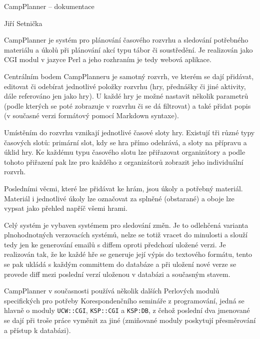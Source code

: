 




\def\heading#1{\goodbreak\bigskip\noindent{\csc\settextsize{15}#1}\medskip}

\centerline{\csc{} CampPlanner -- dokumentace}
\bigskip
\centerline{\csc{} Jiří Setnička}
\bigskip

CampPlanner je systém pro plánování časového rozvrhu a sledování potřebného
materiálu a úkolů při plánování akcí typu tábor či soustředění. Je realizován
jako CGI modul v jazyce Perl a jeho rozhraním je tedy webová aplikace.

Centrálním bodem CampPlanneru je samotný rozvrh, ve kterém se dají přidávat,
editovat či odebírat jednotlivé položky rozvrhu (hry, přednášky či jiné aktivity,
dále referováno jen jako {\I hry}). U každé hry je možné nastavit několik
parametrů (podle kterých se poté zobrazuje v rozvrhu či se dá filtrovat) a také
přidat popis (v současné verzi formátový pomocí Markdown syntaxe).

Umístěním do rozvrhu vznikají jednotlivé časové sloty hry. Existují tři různé
typy časových slotů: primární slot, kdy se hra přímo odehrává, a sloty na
přípravu a úklid hry. Ke každému typu časového slotu lze přiřazovat organizátory
a podle tohoto přiřazení pak lze pro každého z organizátorů zobrazit jeho
individuální rozvrh.

Posledními věcmi, které lze přidávat ke hrám, jsou úkoly a potřebný materiál.
Materiál i jednotlivé úkoly lze označovat za splněné (obstarané) a oboje lze
vypsat jako přehled napříč všemi hrami.

Celý systém je vybaven systémem pro sledování změn. Je to odlehčená varianta
plnohodnotných verzovacích systémů, nelze se totiž vracet do minulosti a slouží
tedy jen ke generování emailů s diffem oproti předchozí uložené verzi. Je
realizován tak, že ke každé hře se generuje její výpis do textového formátu,
tento se pak ukládá s každým committem do databáze a při uložení nové verze se
provede diff mezi poslední verzí uloženou v databázi a současným stavem.

\heading{Použití}

CampPlanner v současnosti používá několik dalších Perlových modulů specifických
pro potřeby Korespondenčního semináře z programování, jedná se hlavně o moduly
{\tt UCW::CGI}, {\tt KSP::CGI} a {\tt KSP:DB}, z čehož poslední dva jmenované se
dají při troše práce vyměnit za jiné (zmiňované moduly poskytují přesměrování
a přístup k databázi).

